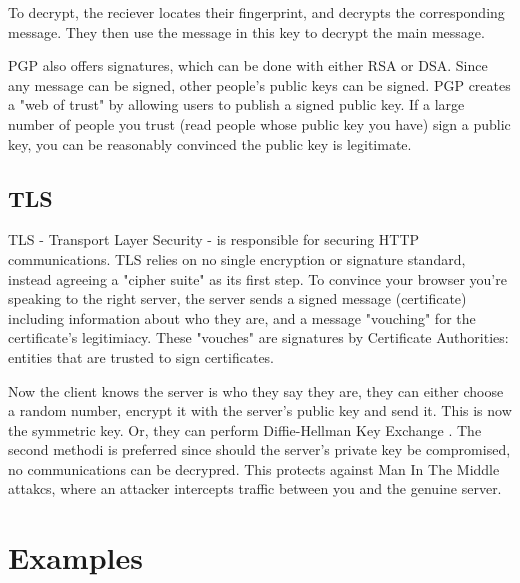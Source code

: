 \documentclass{article}
\begin{document}
To decrypt, the reciever locates their fingerprint, and decrypts the corresponding message.
They then use the message in this key to decrypt the main message.

PGP also offers signatures, which can be done with either RSA or DSA.
Since any message can be signed, other people's public keys can be signed.
PGP creates a "web of trust" by allowing users to publish a signed public key.
If a large number of people you trust (read people whose public key you have)
sign a public key, you can be reasonably convinced the public key is legitimate.
\subsection{TLS}
TLS - Transport Layer Security - is responsible for securing HTTP communications.
TLS relies on no single encryption or signature standard, instead agreeing a "cipher suite" as its first step.
To convince your browser you're speaking to the right server,
the server sends a signed message (certificate) including information about who they are,
and a message "vouching" for the certificate's legitimiacy.
These "vouches" are signatures by Certificate Authorities: entities that are trusted to sign certificates.

Now the client knows the server is who they say they are,
they can either choose a random number, encrypt it with the server's public key and send it.
This is now the symmetric key.
Or, they can perform Diffie-Hellman Key Exchange \cite{Directions}.
The second methodi is preferred since should the server's private key be compromised,
no communications can be decrypred.
This protects against Man In The Middle attakcs, where an attacker intercepts traffic between you and the genuine server.

\section{Examples}
\end{document}
